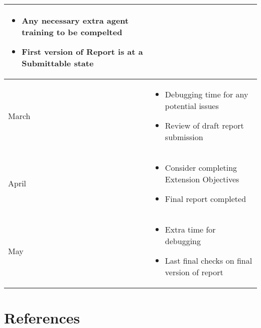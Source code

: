 \documentclass{surrey_disso_style}
\begin{document}
\begin{center}
\begin{tabular}{|p{1.6cm}|p{13cm}|}
\begin{itemize}
      \item Any necessary extra agent training to be compelted
      \item First version of Report is at a Submittable state
   \end{itemize}\\
   \hline
   March & \begin{itemize}
      \item Debugging time for any potential issues 
      \item Review of draft report submission
   \end{itemize}\\
   \hline
   April & \begin{itemize}
      \item Consider completing Extension Objectives
      \item Final report completed 
   \end{itemize}\\
   \hline
   May & \begin{itemize}
      \item Extra time for debugging
      \item Last final checks on final version of report
   \end{itemize}\\
   \hline

\end{tabular}
\end{center}

\newpage


%
%

\section{References}
\printbibliography[heading=none]
\end{document}

